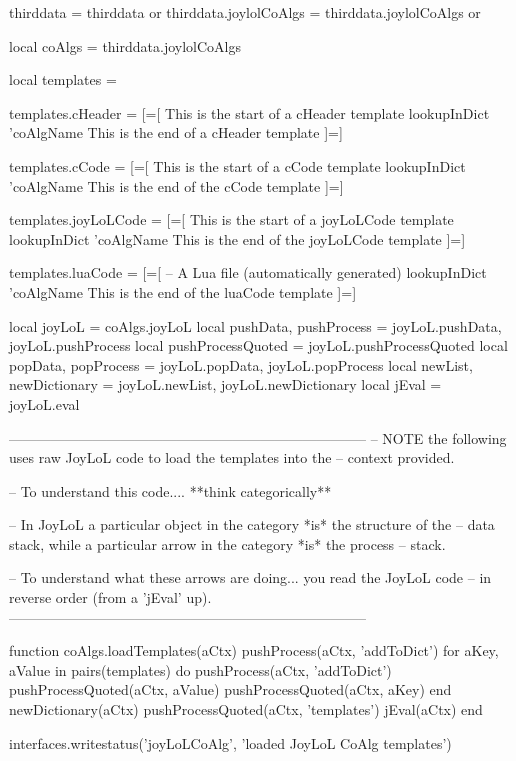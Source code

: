 thirddata              = thirddata              or {}
thirddata.joylolCoAlgs = thirddata.joylolCoAlgs or {}

local coAlgs     = thirddata.joylolCoAlgs

local templates  = { }

templates.cHeader = [=[
This is the start of a cHeader template
{{ lookupInDict 'coAlgName }}
This is the end of a cHeader template
]=]

templates.cCode = [=[
This is the start of a cCode template
{{ lookupInDict 'coAlgName }}
This is the end of the cCode template
]=]

templates.joyLoLCode = [=[
This is the start of a joyLoLCode template
{{ lookupInDict 'coAlgName }}
This is the end of the joyLoLCode template
]=]

templates.luaCode = [=[
-- A Lua file (automatically generated)
{{ lookupInDict 'coAlgName }}
This is the end of the luaCode template
]=]

local joyLoL = coAlgs.joyLoL
local pushData, pushProcess = joyLoL.pushData, joyLoL.pushProcess
local pushProcessQuoted = joyLoL.pushProcessQuoted
local popData, popProcess   = joyLoL.popData, joyLoL.popProcess
local newList, newDictionary = joyLoL.newList, joyLoL.newDictionary
local jEval = joyLoL.eval

-----------------------------------------------------------------------------
-- NOTE the following uses raw JoyLoL code to load the templates into the 
-- context provided. 

-- To understand this code.... **think categorically**

-- In JoyLoL a particular object in the category *is* the structure of the 
-- data stack, while a particular arrow in the category *is* the process 
-- stack.

-- To understand what these arrows are doing... you read the JoyLoL code 
-- in reverse order (from a 'jEval' up). 
-----------------------------------------------------------------------------

function coAlgs.loadTemplates(aCtx)
  pushProcess(aCtx, 'addToDict')
  for aKey, aValue in pairs(templates) do
    pushProcess(aCtx, 'addToDict')
    pushProcessQuoted(aCtx, aValue)
    pushProcessQuoted(aCtx, aKey)
  end
  newDictionary(aCtx)
  pushProcessQuoted(aCtx, 'templates')
  jEval(aCtx)
end

interfaces.writestatus('joyLoLCoAlg', 'loaded JoyLoL CoAlg templates')
\stopLuaTemplate

\stopchapter
